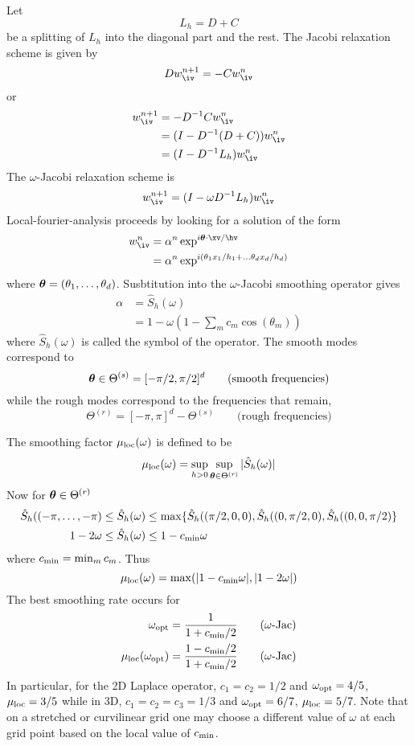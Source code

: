 \documentclass[12pt]{article}
\begin{document}
Let
\[ 
    L_h = D + C
\]
be a splitting of $L_h$ into the diagonal part and the rest.
The Jacobi relaxation scheme is given by 
\[
   D w_{\iv}^{n+1} = -C w_{\iv}^{n}
\]
or
\begin{align*}
    w_{\iv}^{n+1} & = - D^{-1}C w_{\iv}^{n} \\
                  &= (I - D^{-1}( D+C ) )w_{\iv}^{n} \\
                  &= (I - D^{-1}L_h )w_{\iv}^{n}
\end{align*}
The $\omega$-Jacobi relaxation scheme is
\[
   w_{\iv}^{n+1} =  (I - \omega D^{-1} L_h ) w_{\iv}^{n}
\]
Local-fourier-analysis  proceeds by 
looking for a solution of the form
\begin{align*}
   w_{\iv}^{n} &= \alpha^n \exp^{ i \thetav\cdot\xv/\hv }  \\
               &= \alpha^n \exp^{ i (\theta_1 x_1/h_1 + \ldots \theta_d x_d/h_d) }
\end{align*}
where $\boldsymbol{\theta}=(\theta_1,\ldots,\theta_d)$. Susbtitution into the $\omega$-Jacobi smoothing
operator  gives 
\begin{align*}
    \alpha &= \hat{S}_h(\omega)  \\
           &= 1 - \omega ( 1 - \sum_m c_m \cos(\theta_m) )
\end{align*}
where $\hat{S}_h(\omega)$ is called the symbol of the operator.
The smooth modes correspond to 
\[
 \boldsymbol{\theta}\in \Theta^{(s)} = [-\pi/2,\pi/2]^d \qquad\mbox{(smooth frequencies)}
\]
while the rough modes correspond to the frequencies that remain,
\[
\Theta^{(r)} = [-\pi,\pi]^d - \Theta^{(s)} \qquad\mbox{(rough frequencies)}
\]

\newcommand{\cmin}{c_{\rm min}}
\newcommand{\cmax}{C_{\rm max}}

The smoothing factor $\mu_{\rm loc}(\omega)$ is defined to be
\[
   \mu_{\rm loc} (\omega) = \sup_{h>0} \sup_{\boldsymbol{\theta}\in \Theta^{(r)}} \vert  \hat{S}_h(\omega)  \vert
\]
Now for $\boldsymbol{\theta}\in \Theta^{(r)}$
\begin{align*}
     \hat{S}_h((-\pi,\ldots,-\pi) &\le \hat{S}_h(\omega) \le
            \max \{ \hat{S}_h((\pi/2,0,0),\hat{S}_h((0,\pi/2,0), \hat{S}_h((0,0,\pi/2) \} \\
      1-2\omega &\le \hat{S}_h(\omega) \le 1 - \cmin \omega 
\end{align*}
where $\cmin = \min_m c_m$.
Thus
\[
    \mu_{\rm loc}(\omega) =  \max( \vert 1 - \cmin\omega \vert, \vert 1 - 2\omega \vert )
\]
The best smoothing rate occurs for 
\begin{align*}
  \omega_{\rm opt} &= {1\over 1+ \cmin/2} \qquad\mbox{($\omega$-Jac)}\\
 \mu_{\rm loc}(\omega_{\rm opt}) &= {1 - \cmin/2 \over 1+ \cmin/2 } \qquad\mbox{($\omega$-Jac)}
\end{align*}
In particular, for the 2D Laplace operator, $c_1=c_2=1/2$ and $\omega_{\rm opt}=4/5$, $\mu_{\rm loc}=3/5$
while in 3D, $c_1=c_2=c_3=1/3$ and $\omega_{\rm opt}=6/7$, $\mu_{\rm loc}=5/7$.
Note that on a stretched or curvilinear grid one may choose a different value of $\omega$ at each grid point based
on the local value of $\cmin$.
\end{document}
